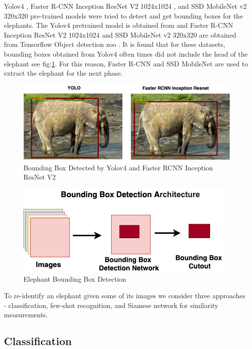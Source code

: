 \documentclass[10pt,twocolumn,letterpaper]{article}
\begin{document}
Yolov4 \cite{yolov4}, Faster R-CNN Inception ResNet V2 1024x1024 \cite{fasterrcnn}, and SSD MobileNet v2 320x320 \cite{ssdnet} pre-trained models were tried to detect and get bounding boxes for the elephants. The Yolov4 pretrained model is obtained from \cite{tf2yolov4} and Faster R-CNN Inception ResNet V2 1024x1024 and SSD MobileNet v2 320x320 are obtained from Tensorflow Object detection zoo \cite{tensorflowzoo}. It is found that for these datasets, bounding boxes obtained from Yolov4 often times did not include the head of the elephant see fig:\ref{fig:boundingbox_comparison}. For this reason, Faster R-CNN and SSD MobileNet are used to extract the elephant for the next phase.

\begin{figure}[t]
  \centering
  \includegraphics[scale=0.2]{Bounding_box}
   \caption{Bounding Box Detected by Yolov4 and Faster RCNN Inception ResNet V2}
   \label{fig:boundingbox_comparison}
\end{figure}

\begin{figure}[t]
  \centering
  \includegraphics[scale=0.35]{boundingbox_network}
   \caption{Elephant Bounding Box Detection}
   \label{fig:boundingbox_network}
\end{figure}

To re-identify an elephant given some of its images we consider three approaches - classification, few-shot recognition, and Siamese network for similarity measurements.

\subsection{Classification}
\end{document}

